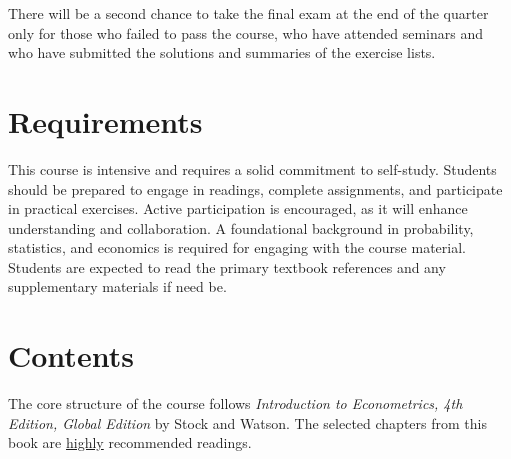\documentclass[12pt]{article}
\begin{document}
There will be a second chance to take the final exam at the end of the quarter only  for those  who  failed  to  pass  the  course,  who  have  attended  seminars and  who  have submitted the solutions and summaries of the exercise lists. 


\section*{Requirements}
This course is intensive and requires a solid commitment to self-study. Students should be prepared to engage in readings, complete assignments, and participate in practical exercises. Active participation is encouraged, as it will enhance understanding and collaboration. A foundational background in probability, statistics, and economics is required for engaging with the course material. Students are expected to read the primary textbook references and any supplementary materials if need be.

\section*{Contents}

The core structure of the course follows \textit{Introduction to Econometrics, 4th Edition, Global Edition} by Stock and Watson. The selected chapters from this book are \underline{highly} recommended readings.
\end{document}
